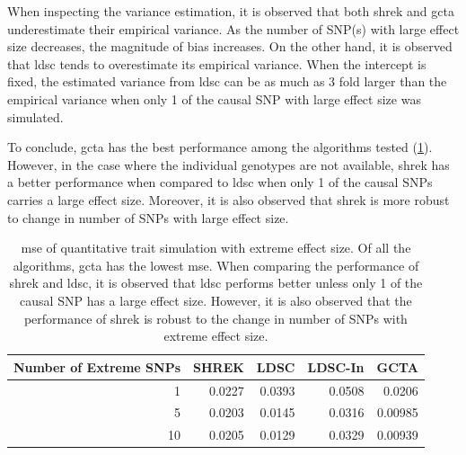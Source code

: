 \documentclass[12pt]{scrbook}
\begin{document}
When inspecting the variance estimation, it is observed that both \gls{shrek} and \gls{gcta} underestimate their empirical variance. 
As the number of \gls{SNP}(s) with large effect size decreases, the magnitude of bias increases.
On the other hand, it is observed that \gls{ldsc} tends to overestimate its empirical variance. 
When the intercept is fixed, the estimated variance from \gls{ldsc} can be as much as 3 fold larger than the empirical variance when only 1 of the causal \gls{SNP} with large effect size was simulated. 

To conclude, \gls{gcta} has the best performance among the algorithms tested (\cref{tab:mseEx100c}).
However, in the case where the individual genotypes are not available, \gls{shrek} has a better performance when compared to \gls{ldsc} when only 1 of the causal \glspl{SNP} carries a large effect size.
Moreover, it is also observed that \gls{shrek} is more robust to change in number of \glspl {SNP} with large effect size. 

\begin{table}
	\centering
	\begin{tabular}{rrrrr}
		\toprule
		Number of Extreme SNPs&	SHREK&	LDSC&	LDSC-In&	GCTA \\
		\midrule
		1	&	0.0227	&	0.0393	&	0.0508	&	0.0206\\
		5	&	0.0203	&	0.0145	&	0.0316	&	0.00985\\
		10	&	0.0205	&	0.0129	&	0.0329	&	0.00939\\
		\bottomrule
	\end{tabular}
	\caption[MSE of Quantitative Trait Simulation with Extreme Effect Size]{
		\gls{mse} of quantitative trait simulation with extreme effect size.
		Of all the algorithms, \gls{gcta} has the lowest \gls{mse}.
		When comparing the performance of \gls{shrek} and \gls{ldsc}, it is observed that \gls{ldsc} performs better unless only 1 of the causal \gls{SNP} has a large effect size.
		However, it is also observed that the performance of \gls{shrek} is robust to the change in number of \glspl{SNP} with extreme effect size.
	}
	\label{tab:mseEx100c}
\end{table}
\end{document}
